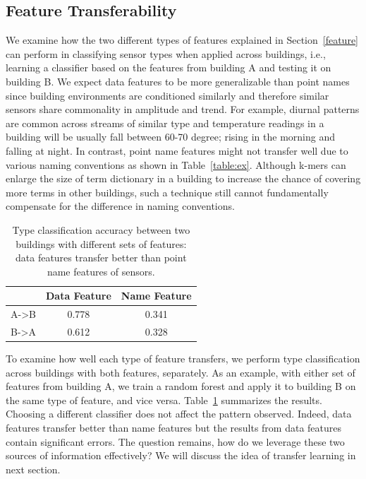 \subsection{Feature Transferability}
We examine how the two different types of features explained in Section~\ref{feature} can perform in classifying sensor types when applied across buildings, i.e., learning a classifier based on the features from building A and testing it on building B. 
We expect data features to be more generalizable than point names since 
building environments are conditioned similarly and therefore similar sensors 
share commonality in amplitude and trend.  For example, diurnal patterns are common across streams of similar type and 
temperature readings in a building will be usually fall between 60-70 degree; rising in the morning and falling at night.
In contrast, point name features might not transfer well due to various naming conventions as shown in Table~\ref{table:ex}.
Although k-mers can enlarge the size of term dictionary in a building to increase the chance of covering more terms in other buildings, such a technique still cannot fundamentally compensate for the difference in naming conventions.


\begin{table}[h]
\centering
\begin{tabular}{l|c|c}
\hline
                & Data Feature & Name Feature \\ \hline
A-\textgreater B & 0.778       & 0.341       \\
B-\textgreater A & 0.612       & 0.328       \\ \hline
\end{tabular}
\caption{Type classification accuracy between two buildings with different sets of features: data features transfer better than point name features of sensors.}
\label{table:clf}
\end{table}


To examine how well each type of feature transfers, we perform type classification across buildings with both features, separately.   
As an example, with either set of features from building A, we train a random forest and apply it to building B on the same type of feature, and vice versa. 
Table~\ref{table:clf} summarizes the results. Choosing a different classifier does not affect the pattern observed.
Indeed, data features transfer better than name features but the results from data features contain significant errors. 
The question remains, how do we leverage these two sources of information effectively?
We will discuss the idea of transfer learning in next section.


